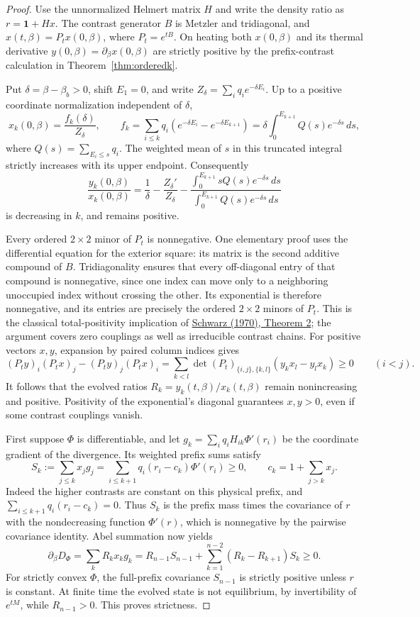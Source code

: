\begin{proof}
Use the unnormalized Helmert matrix $H$ and write the density ratio as
$r=\mathbf1+Hx$. The contrast generator $B$ is Metzler and tridiagonal,
and $x(t,\beta)=P_t x(0,\beta)$, where $P_t=e^{tB}$.
On heating both $x(0,\beta)$ and its thermal derivative
$y(0,\beta)=\partial_\beta x(0,\beta)$ are strictly positive by the
prefix-contrast calculation in Theorem~\ref{thm:orderedk}.

Put $\delta=\beta-\beta_b>0$, shift $E_1=0$, and write
$Z_\delta=\sum_iq_i e^{-\delta E_i}$.
Up to a positive coordinate normalization independent of $\delta$,
\[
x_k(0,\beta)=\frac{f_k(\delta)}{Z_\delta},\qquad
f_k=\sum_{i\leq k}q_i
 (e^{-\delta E_i}-e^{-\delta E_{k+1}})
=\delta\int_0^{E_{k+1}}Q(s)e^{-\delta s}\,ds,
\]
where $Q(s)=\sum_{E_i\leq s}q_i$.
The weighted mean of $s$ in this truncated integral strictly increases
with its upper endpoint. Consequently
\[
\frac{y_k(0,\beta)}{x_k(0,\beta)}
=\frac1\delta-\frac{Z_\delta'}{Z_\delta}
 -\frac{\int_0^{E_{k+1}}sQ(s)e^{-\delta s}\,ds}
        {\int_0^{E_{k+1}}Q(s)e^{-\delta s}\,ds}
\]
is decreasing in $k$, and remains positive.

Every ordered $2\times2$ minor of $P_t$ is nonnegative. One elementary
proof uses the differential equation for the exterior square: its
matrix is the second additive compound of $B$. Tridiagonality ensures
that every off-diagonal entry of that compound is nonnegative, since
one index can move only to a neighboring unoccupied index without
crossing the other. Its exponential is therefore nonnegative, and its
entries are precisely the ordered $2\times2$ minors of $P_t$.
This is the classical total-positivity implication of
\href{https://msp.org/pjm/1970/32-1/pjm-v32-n1-p20-p.pdf}{Schwarz (1970),
Theorem 2}; the argument covers zero couplings as well as irreducible
contrast chains.
For positive vectors $x,y$, expansion by paired column indices gives
\[
(P_ty)_i(P_tx)_j-(P_ty)_j(P_tx)_i
=\sum_{k<l}\det(P_t)_{\{i,j\},\{k,l\}}
  (y_kx_l-y_lx_k)\geq0\qquad(i<j).
\]
It follows that the evolved ratios $R_k=y_k(t,\beta)/x_k(t,\beta)$
remain nonincreasing and positive. Positivity of the exponential's
diagonal guarantees $x,y>0$, even if some contrast couplings vanish.

First suppose $\Phi$ is differentiable, and let
$g_k=\sum_iq_i H_{ik}\Phi'(r_i)$ be the coordinate gradient of the
divergence. Its weighted prefix sums satisfy
\[
S_k:=\sum_{j\leq k}x_jg_j
=\sum_{i\leq k+1}q_i(r_i-c_k)\Phi'(r_i)\geq0,
\qquad c_k=1+\sum_{j>k}x_j.
\]
Indeed the higher contrasts are constant on this physical prefix,
and $\sum_{i\leq k+1}q_i(r_i-c_k)=0$. Thus $S_k$ is the prefix mass
times the covariance of $r$ with the nondecreasing function $\Phi'(r)$,
which is nonnegative by the pairwise covariance identity.
Abel summation now yields
\[
\partial_\beta D_\Phi
=\sum_kR_k x_kg_k
=R_{n-1}S_{n-1}
 +\sum_{k=1}^{n-2}(R_k-R_{k+1})S_k\geq0.
\]
For strictly convex $\Phi$, the full-prefix covariance $S_{n-1}$ is
strictly positive unless $r$ is constant. At finite time the evolved
state is not equilibrium, by invertibility of $e^{tM}$, while
$R_{n-1}>0$. This proves strictness.


\end{proof}
